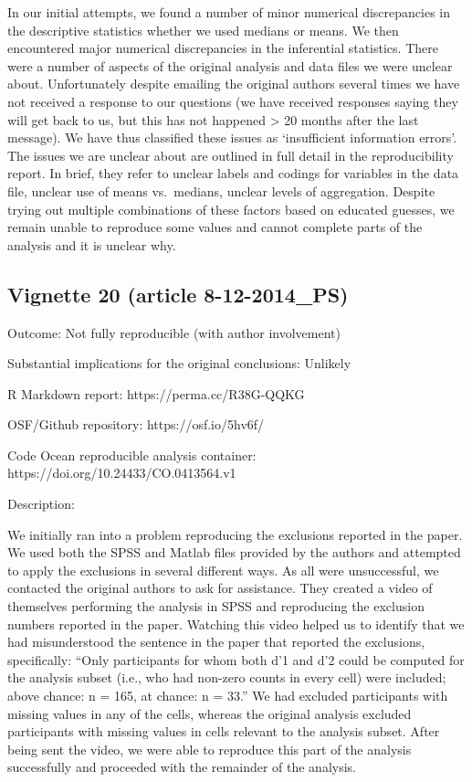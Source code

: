 \begin{appendix}
In our initial attempts, we found a number of minor numerical
discrepancies in the descriptive statistics whether we used medians or
means. We then encountered major numerical discrepancies in the
inferential statistics. There were a number of aspects of the original
analysis and data files we were unclear about. Unfortunately despite
emailing the original authors several times we have not received a
response to our questions (we have received responses saying they will
get back to us, but this has not happened \textgreater{} 20 months after
the last message). We have thus classified these issues as `insufficient
information errors'. The issues we are unclear about are outlined in
full detail in the reproducibility report. In brief, they refer to
unclear labels and codings for variables in the data file, unclear use
of means vs.~medians, unclear levels of aggregation. Despite trying out
multiple combinations of these factors based on educated guesses, we
remain unable to reproduce some values and cannot complete parts of the
analysis and it is unclear why.

\hypertarget{vignette-20-article-8-12-2014_ps}{%
\subsection{Vignette 20 (article
8-12-2014\_PS)}\label{vignette-20-article-8-12-2014_ps}}

Outcome: Not fully reproducible (with author involvement)

Substantial implications for the original conclusions: Unlikely

R Markdown report: https://perma.cc/R38G-QQKG

OSF/Github repository: https://osf.io/5hv6f/

Code Ocean reproducible analysis container:
https://doi.org/10.24433/CO.0413564.v1

Description:

We initially ran into a problem reproducing the exclusions reported in
the paper. We used both the SPSS and Matlab files provided by the
authors and attempted to apply the exclusions in several different ways.
As all were unsuccessful, we contacted the original authors to ask for
assistance. They created a video of themselves performing the analysis
in SPSS and reproducing the exclusion numbers reported in the paper.
Watching this video helped us to identify that we had misunderstood the
sentence in the paper that reported the exclusions, specifically: ``Only
participants for whom both d'1 and d'2 could be computed for the
analysis subset (i.e., who had non-zero counts in every cell) were
included; above chance: n = 165, at chance: n = 33.'' We had excluded
participants with missing values in any of the cells, whereas the
original analysis excluded participants with missing values in cells
relevant to the analysis subset. After being sent the video, we were
able to reproduce this part of the analysis successfully and proceeded
with the remainder of the analysis.


\end{appendix}
